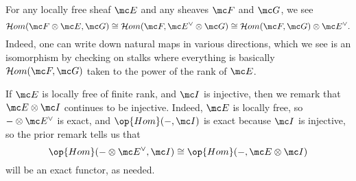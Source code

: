 \documentclass[../notes.tex]{subfiles}
\begin{document}
\begin{remark} \label{rem:locally-free-move-hom}
	For any locally free sheaf $\mc E$ and any sheaves $\mc F$ and $\mc G$, we see
	\[\mathcal Hom(\mc F\otimes\mc E,\mc G)\cong\mathcal Hom(\mc F,\mc E^\lor\otimes\mc G)\cong\mathcal Hom(\mc F,\mc G)\otimes\mc E^\lor.\]
	Indeed, one can write down natural maps in various directions, which we see is an isomorphism by checking on stalks where everything is basically $\mathcal Hom(\mc F,\mc G)$ taken to the power of the rank of $\mc E$.
\end{remark}
\begin{remark}
	If $\mc E$ is locally free of finite rank, and $\mc I$ is injective, then we remark that $\mc E\otimes\mc I$ continues to be injective. Indeed, $\mc E$ is locally free, so $-\otimes\mc E^\lor$ is exact, and $\op{Hom}(-,\mc I)$ is exact because $\mc I$ is injective, so the prior remark tells us that
	\[\op{Hom}(-\otimes\mc E^\lor,\mc I)\cong\op{Hom}(-,\mc E\otimes\mc I)\]
	will be an exact functor, as needed.
\end{remark}
\end{document}
